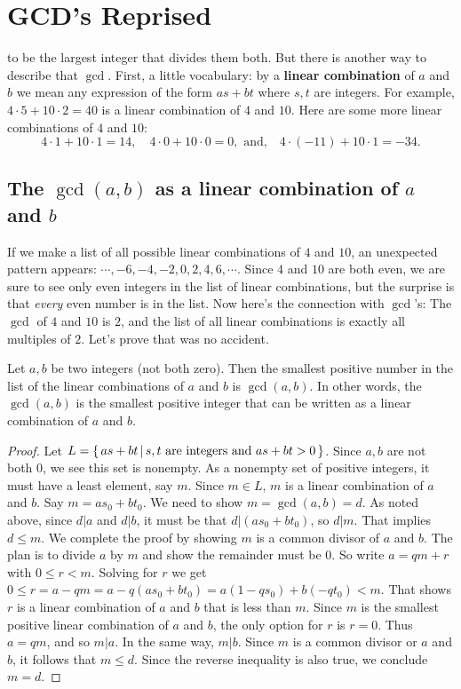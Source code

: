 \chapter{GCD's Reprised}\label{chpt:gcd's reprised}

 to be the largest integer that divides them both. But there is 
another way to describe that $\gcd$. First, a little vocabulary: by a 
{\bfseries linear combination} of $a$ and $b$ we mean any expression of the form
$as+bt$ where $s,t$ are integers. For example, $4\cdot5 + 10\cdot2 = 40$ is a linear
combination of $4$ and $10$. Here are some more linear combinations of $4$ and $10$:
\[
 4\cdot1 + 10\cdot1 = 14, \quad
 4\cdot0 + 10\cdot0 = 0, \text{ and,} \quad
 4\cdot(-11) + 10\cdot1 = -34.
\]

\section{The $\gcd(a,b)$ as a linear combination of $a$ and $b$}
If we make a list of all possible linear combinations of $4$ and $10$, an unexpected pattern
appears: $\cdots, -6,-4,-2,0,2,4,6,\cdots$. Since $4$ and $10$ are both even, we are sure to
see only even integers in the list of linear combinations, but the surprise is that {\itshape every}
even number is in the list. Now here's the connection with $\gcd$'s: The $\gcd$ of $4$ and $10$
is $2$, and the list of all linear combinations is exactly all multiples of $2$. Let's  prove that
was no accident.

\begin{thm}\label{thm:gcd lin comb}
Let $a,b$ be two integers (not both zero). Then the smallest positive number
in the list of the linear combinations of $a$ and $b$ is $\gcd(a,b)$.
In other words, the $\gcd(a,b)$ is the smallest positive integer that can be written as a linear
combination of $a$ and $b$.
\end{thm}
\begin{proof}Let $L = \{\,as+bt\,|\, s, t \hbox{ are integers and } as+bt>0\,\}$. Since $a,b$
are not both $0$, we see this set is nonempty. As a nonempty set of positive integers, it must 
have a least element, say $m$. Since $m\in L$, $m$ is a linear combination of $a$ and $b$. 
Say $m= as_0+bt_0$. We need to show $m= \gcd(a,b) = d$. As noted above, since $d|a$ and
$d|b$, it must be that $d|(as_0+bt_0)$, so $d|m$. That implies $d\leq m$. We complete the
proof by showing $m$ is a common divisor of $a$ and $b$. The plan is to divide $a$ by $m$
and show the remainder must be $0$. So write $a=qm+r$ with $0\leq r<m$. Solving for $r$
we get $0\leq r = a-qm = a-q(as_0+bt_0) = a(1-qs_0) + b(-qt_0) <m$. That shows $r$ is a 
linear combination of $a$ and $b$ that is less than $m$. Since $m$ is the smallest positive
linear combination of $a$ and $b$, the only option for $r$ is $r=0$. Thus $a=qm$, and so
$m|a$. In the same way, $m|b$. Since $m$ is a common divisor or $a$ and $b$, it follows
that $m\leq d$. Since the reverse inequality is also true, we conclude $m=d$.
\end{proof}

